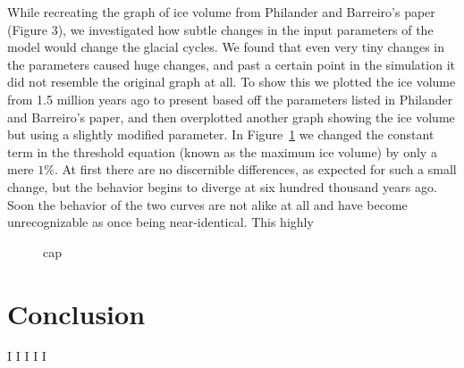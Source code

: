 \documentclass[11pt]{article}
\begin{document}
While recreating the graph of ice volume from Philander and Barreiro's paper (Figure 3), we investigated how subtle changes in the input parameters of the model would change the glacial cycles.
We found that even very tiny changes in the parameters caused huge changes, and past a certain point in the simulation it did not resemble the original graph at all.
To show this we plotted the ice volume from 1.5 million years ago to present based off the parameters listed in Philander and Barreiro's paper, and then overplotted another graph showing the ice volume but using a slightly modified parameter.
In Figure~\ref{alpha} we changed the constant term in the threshold equation (known as the maximum ice volume) by only a mere $1\%$.
At first there are no discernible differences, as expected for such a small change, but the behavior begins to diverge at six hundred thousand years ago.
Soon the behavior of the two curves are not alike at all and have become unrecognizable as once being near-identical.
This highly 

\begin{figure}
  \centering
  
  \caption{cap}
  \label{alpha}
\end{figure}


\section{Conclusion}



\begin{thebibliography}{9}
		I
		I
        I
		I%
        I%
\end{thebibliography}
\end{document}
